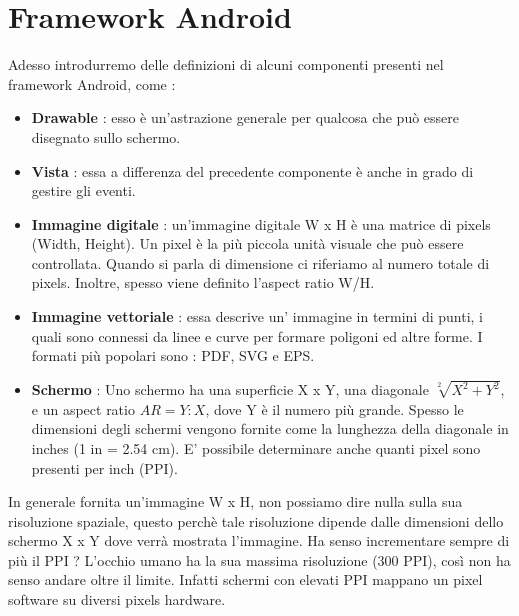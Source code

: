 \documentclass[12pt]{report}
\begin{document}
\chapter{Framework Android}
Adesso introdurremo delle definizioni di alcuni componenti presenti nel framework Android, come :
\begin{itemize}
\item \textbf{Drawable} : esso è un'astrazione generale per qualcosa che può essere disegnato sullo schermo.
\item \textbf{Vista} : essa a differenza del precedente componente è anche in grado di gestire gli eventi.
\item \textbf{Immagine digitale} : un'immagine digitale W x H è una matrice di pixels (Width, Height). Un pixel è la più piccola unità visuale che può essere controllata. Quando si parla di dimensione ci riferiamo al numero totale di pixels. Inoltre, spesso viene definito l'aspect ratio W/H.
\item \textbf{Immagine vettoriale} : essa descrive un' immagine in termini di punti, i quali sono connessi da linee e curve per formare poligoni ed altre forme. I formati più popolari sono : PDF, SVG e EPS.
\item \textbf{Schermo} : Uno schermo ha una superficie X x Y, una diagonale $\sqrt[2]{X^2 + Y^2}$, e un aspect ratio $AR = Y:X$, dove Y è il numero più grande. Spesso le dimensioni degli schermi vengono fornite come la lunghezza della diagonale in inches (1 in = 2.54 cm). E' possibile determinare anche quanti pixel sono presenti per inch (PPI).
\end{itemize}
In generale fornita un'immagine W x H, non possiamo dire nulla sulla sua risoluzione spaziale, questo perchè tale risoluzione dipende dalle dimensioni dello schermo X x Y dove verrà mostrata l'immagine. Ha senso incrementare sempre di più il PPI ? L'occhio umano ha la sua massima risoluzione (300 PPI), così non ha senso andare oltre il limite. Infatti schermi con elevati PPI mappano un pixel software su diversi pixels hardware.
\end{document}
